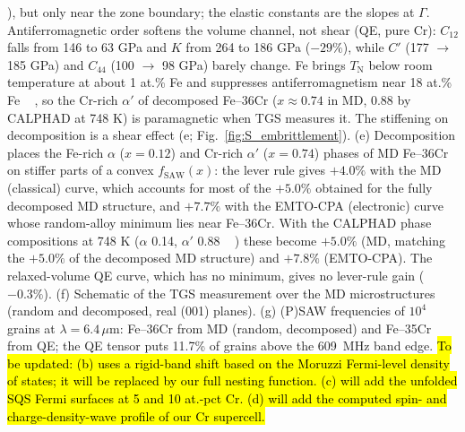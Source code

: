 \documentclass[final,3p,times]{elsarticle}
\DeclareRobustCommand{\upd}[1]{{\sethlcolor{yellow}\hl{To be updated: #1}}} %
\begin{document}
{{\cite{shaw1971investigation}}\hskip0pt%
), but only near the zone boundary; the elastic constants are the slopes at $\Gamma$. Antiferromagnetic order softens the volume channel, not shear (QE, pure Cr): $C_{12}$ falls from 146 to 63 GPa and $K$ from 264 to 186 GPa ($-29\%$), while $C'$ (177 $\to$ 185 GPa) and $C_{44}$ (100 $\to$ 98 GPa) barely change. Fe brings $T_{\mathrm N}$ below room temperature at about 1 at.\% Fe and suppresses antiferromagnetism near 18 at.\% Fe \mbox{%
\cite{xiong2011improved}}\hskip0pt%
, so the Cr-rich $\alpha'$ of decomposed Fe--36Cr ($x\approx0.74$ in MD, 0.88 by CALPHAD at 748 K) is paramagnetic when TGS measures it. The stiffening on decomposition is a shear effect (e; Fig.~\ref{fig:S_embrittlement}). (e) Decomposition places the Fe-rich $\alpha$ ($x=0.12$) and Cr-rich $\alpha'$ ($x=0.74$) phases of MD Fe--36Cr on stiffer parts of a convex $f_{\mathrm{SAW}}(x)$: the lever rule gives $+4.0\%$ with the MD (classical) curve, which accounts for most of the $+5.0\%$ obtained for the fully decomposed MD structure, and $+7.7\%$ with the EMTO-CPA (electronic) curve whose random-alloy minimum lies near Fe--36Cr. With the CALPHAD phase compositions at 748 K ($\alpha$ 0.14, $\alpha'$ 0.88 \mbox{%
\cite{xiong2011improved}}\hskip0pt%
) these become $+5.0\%$ (MD, matching the $+5.0\%$ of the decomposed MD structure) and $+7.8\%$ (EMTO-CPA). The relaxed-volume QE curve, which has no minimum, gives no lever-rule gain ($-0.3\%$). (f) Schematic of the TGS measurement over the MD microstructures (random and decomposed, real (001) planes). (g) (P)SAW frequencies of $10^4$ grains at $\lambda=6.4\,\mu$m: Fe--36Cr from MD (random, decomposed) and Fe--35Cr from QE; the QE tensor puts 11.7\% of grains above the 609~MHz band edge. }\upd{(b) uses a rigid-band shift based on the Moruzzi Fermi-level density of states; it will be replaced by our full nesting function. (c) will add the unfolded SQS Fermi surfaces at 5 and 10 at.-pct Cr. (d) will add the computed spin- and charge-density-wave profile of our Cr supercell.}
\clearpage
\end{document}
